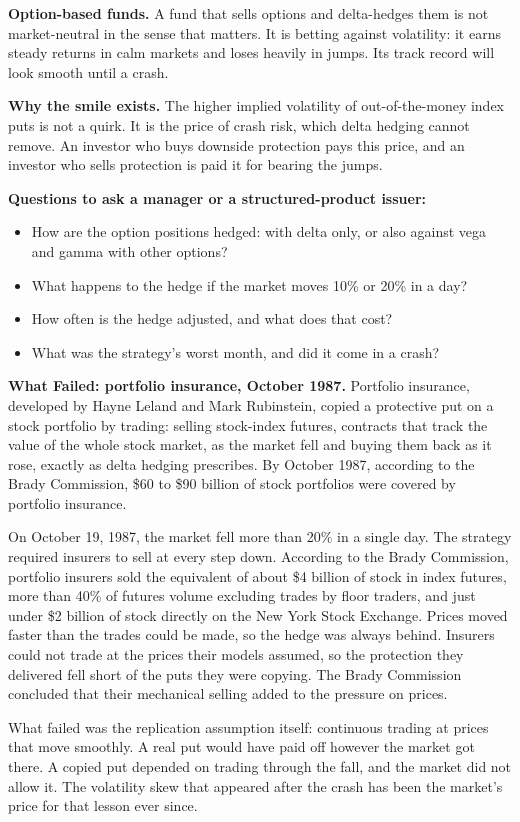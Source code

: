 \textbf{Option-based funds.} A fund that sells options and delta-hedges them is not market-neutral in the sense that matters. It is betting against volatility: it earns steady returns in calm markets and loses heavily in jumps. Its track record will look smooth until a crash.

\textbf{Why the smile exists.} The higher implied volatility of out-of-the-money index puts is not a quirk. It is the price of crash risk, which delta hedging cannot remove. An investor who buys downside protection pays this price, and an investor who sells protection is paid it for bearing the jumps.

\textbf{Questions to ask a manager or a structured-product issuer:}

\begin{itemize}
  \item How are the option positions hedged: with delta only, or also against vega and gamma with other options?
  \item What happens to the hedge if the market moves 10\% or 20\% in a day?
  \item How often is the hedge adjusted, and what does that cost?
  \item What was the strategy's worst month, and did it come in a crash?
\end{itemize}

\begin{callout}
\textbf{What Failed: portfolio insurance, October 1987.} Portfolio insurance, developed by Hayne Leland and Mark Rubinstein, copied a protective put on a stock portfolio by trading: selling stock-index futures, contracts that track the value of the whole stock market, as the market fell and buying them back as it rose, exactly as delta hedging prescribes. By October 1987, according to the Brady Commission, \$60 to \$90 billion of stock portfolios were covered by portfolio insurance.

On October 19, 1987, the market fell more than 20\% in a single day. The strategy required insurers to sell at every step down. According to the Brady Commission, portfolio insurers sold the equivalent of about \$4 billion of stock in index futures, more than 40\% of futures volume excluding trades by floor traders, and just under \$2 billion of stock directly on the New York Stock Exchange. Prices moved faster than the trades could be made, so the hedge was always behind. Insurers could not trade at the prices their models assumed, so the protection they delivered fell short of the puts they were copying. The Brady Commission concluded that their mechanical selling added to the pressure on prices.

What failed was the replication assumption itself: continuous trading at prices that move smoothly. A real put would have paid off however the market got there. A copied put depended on trading through the fall, and the market did not allow it. The volatility skew that appeared after the crash has been the market's price for that lesson ever since.
\end{callout}

